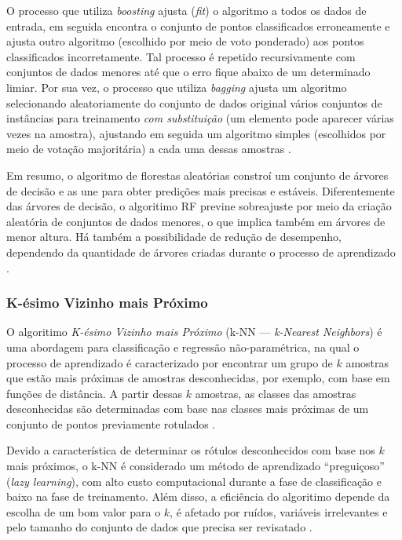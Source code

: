 \documentclass[
	12pt,				%
	oneside,			%
	a4paper,			%
	english,			%
	brazil				%
	]{abntex2ppgsi}
\begin{document}
{O processo que utiliza \textit{boosting} ajusta (\textit{fit}) o algoritmo a todos os dados de entrada, em seguida encontra o conjunto de pontos classificados erroneamente e ajusta outro algoritmo (escolhido por meio de voto ponderado) aos pontos classificados incorretamente. Tal processo é repetido recursivamente com conjuntos de dados menores até que o erro fique abaixo de um determinado limiar.  Por sua vez, o processo que utiliza \textit{bagging} ajusta um algoritmo selecionando aleatoriamente do conjunto de dados original vários conjuntos de instâncias para treinamento \textit{com substituição} (um elemento pode aparecer várias vezes na amostra), ajustando em seguida um algoritmo simples (escolhidos por meio de votação majoritária) a cada uma dessas amostras \cite{mcdonald2014steering, dogru2018traffic}.

Em resumo, o algoritmo de florestas aleatórias constroí um conjunto de árvores de decisão e as une para obter predições mais precisas e estáveis. Diferentemente das árvores de decisão, o algoritimo RF previne sobreajuste por meio da criação aleatória de conjuntos de dados menores, o que implica também em árvores de menor altura. Há também a possibilidade de redução de desempenho, dependendo da quantidade de árvores criadas durante o processo de aprendizado \cite{dogru2018traffic}.

\subsubsection{K-ésimo Vizinho mais Próximo} 

O algoritimo \textit{K-ésimo Vizinho mais Próximo} (k-NN ---  \textit{k-Nearest Neighbors}) é uma abordagem para classificação e regressão não-paramétrica, na  qual o processo de aprendizado é caracterizado por encontrar um grupo de $k$ amostras que estão mais próximas de amostras desconhecidas, por exemplo, com base em funções de distância. A partir dessas $k$ amostras, as classes das amostras desconhecidas são determinadas com base nas classes mais próximas de um conjunto de pontos previamente rotulados \cite{singh2016review, thanh2018comparison}. 

Devido a característica de determinar os rótulos desconhecidos com base nos $k$ mais próximos, o k-NN é considerado um método de aprendizado ``preguiçoso'' (\textit{lazy learning}), com alto custo computacional durante a fase de classificação  e baixo na fase de treinamento. Além disso, a eficiência do algoritimo depende da escolha de um bom valor para o $k$, é afetado por ruídos, variáveis irrelevantes e pelo tamanho do conjunto de dados que precisa ser revisatado \cite{singh2016review, kibanov2018adaptive}. 

}
\end{document}
